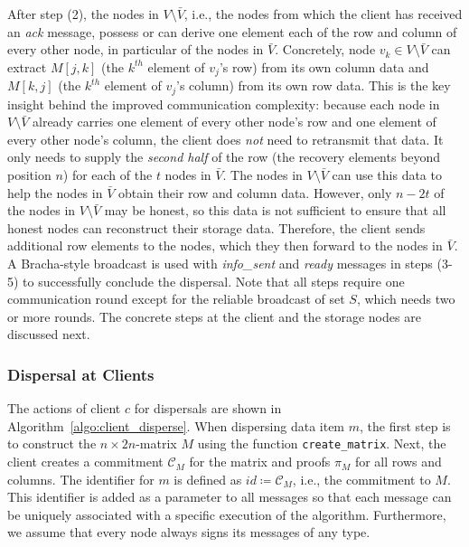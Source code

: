 \documentclass[sigconf,screen]{acmart}
\begin{document}
After step (2), the nodes in $V\setminus\bar{V}$, i.e., the nodes from which the client has received an \emph{ack} message, possess or can derive one element each of the row and column of every other node, in particular of the nodes in $\bar{V}$.
Concretely, node $v_k \in V\setminus\bar{V}$ can extract $M[j,k]$ (the $k^{th}$ element of $v_j$'s row) from its own column data and $M[k,j]$ (the $k^{th}$ element of $v_j$'s column) from its own row data.
This is the key insight behind the improved communication complexity: because each node in $V\setminus\bar{V}$ already carries one element of every other node's row and one element of every other node's column, the client does \emph{not} need to retransmit that data. It only needs to supply the \emph{second half} of the row (the recovery elements beyond position $n$) for each of the $t$ nodes in $\bar{V}$.
The nodes in $V\setminus\bar{V}$ can use this data to help the nodes in $\bar{V}$ obtain their row and column data.
However, only $n-2t$ of the nodes in $V\setminus\bar{V}$ may be honest, so this data is not sufficient to ensure that all honest nodes can reconstruct their storage data.
Therefore, the client sends additional row elements to the nodes, which they then forward to the nodes in $\bar{V}$.
A Bracha-style broadcast is used with \emph{info\_sent} and \emph{ready} messages in steps (3-5) to successfully conclude the dispersal. Note that all steps require one communication round except for the reliable broadcast of set $S$, which needs two or more rounds.
The concrete steps at the client and the storage nodes are discussed next.

\subsubsection{Dispersal at Clients}

The actions of client $c$ for dispersals are shown in Algorithm~\ref{algo:client_disperse}.
When dispersing data item $m$, the first step is to construct the $n \times 2n$-matrix $M$ using the function \texttt{create\_matrix}.
Next, the client creates a commitment $\mathcal{C}_M$ for the matrix and proofs $\pi_M $ for all rows and columns.
The identifier for $m$ is defined as $id \coloneqq \mathcal{C}_M$, i.e., the commitment to $M$. This identifier is added as a parameter to all messages so that each message can be uniquely associated with a specific execution of the algorithm. Furthermore, we assume that every node always signs its messages of any type.
\end{document}
